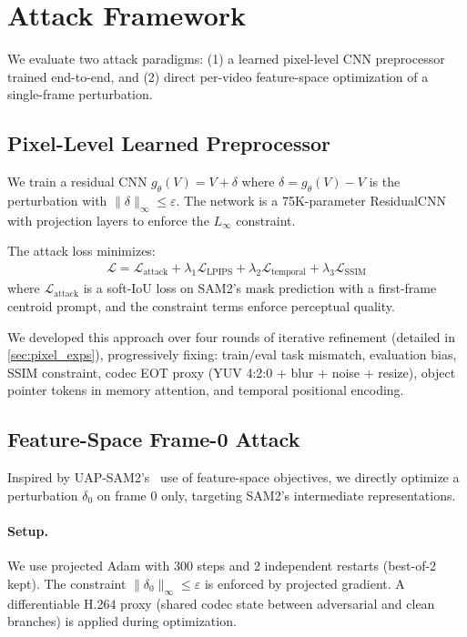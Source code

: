 \section{Attack Framework}
\label{sec:attacks}

We evaluate two attack paradigms: (1) a learned pixel-level CNN preprocessor trained end-to-end, and (2) direct per-video feature-space optimization of a single-frame perturbation.

\subsection{Pixel-Level Learned Preprocessor}
\label{sec:pixel_attack}

We train a residual CNN $g_\theta(V) = V + \delta$ where $\delta = g_\theta(V) - V$ is the perturbation with $\|\delta\|_\infty \leq \varepsilon$. The network is a 75K-parameter ResidualCNN with projection layers to enforce the $L_\infty$ constraint.

The attack loss minimizes:
\begin{align}
  \mathcal{L} = \mathcal{L}_\text{attack} + \lambda_1 \mathcal{L}_\text{LPIPS} + \lambda_2 \mathcal{L}_\text{temporal} + \lambda_3 \mathcal{L}_\text{SSIM}
\end{align}
where $\mathcal{L}_\text{attack}$ is a soft-IoU loss on SAM2's mask prediction with a first-frame centroid prompt, and the constraint terms enforce perceptual quality.

We developed this approach over four rounds of iterative refinement (detailed in \cref{sec:pixel_exps}), progressively fixing: train/eval task mismatch, evaluation bias, SSIM constraint, codec EOT proxy (YUV 4:2:0 + blur + noise + resize), object pointer tokens in memory attention, and temporal positional encoding.

\subsection{Feature-Space Frame-0 Attack}
\label{sec:feature_attack}

Inspired by UAP-SAM2's~\citep{uap_sam2_2025} use of feature-space objectives, we directly optimize a perturbation $\delta_0$ on frame 0 only, targeting SAM2's intermediate representations.

\paragraph{Setup.}
We use projected Adam with 300 steps and 2 independent restarts (best-of-2 kept). The constraint $\|\delta_0\|_\infty \leq \varepsilon$ is enforced by projected gradient. A differentiable H.264 proxy (shared codec state between adversarial and clean branches) is applied during optimization.

